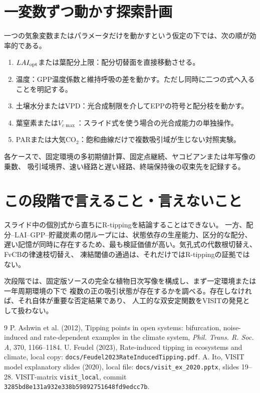 \documentclass[a4paper,11pt]{ltjsarticle}
\newcommand{\code}[1]{\nolinkurl{#1}}
\begin{document}
\section{一変数ずつ動かす探索計画}
一つの気象変数またはパラメータだけを動かすという仮定の下では、次の順が効率的である。
\begin{enumerate}
\item $LAI_{\rm opt}$または葉配分上限：配分切替面を直接移動させる。
\item 温度：GPP温度係数と維持呼吸の差を動かす。ただし同時に二つの式へ入ることを明記する。
\item 土壌水分またはVPD：光合成制限を介してEPPの符号と配分枝を動かす。
\item 葉窒素または$V_{c\max}$：スライド式を使う場合の光合成能力の単独操作。
\item PARまたは大気$\mathrm{CO_2}$：飽和曲線だけで複数吸引域が生じない対照実験。
\end{enumerate}
各ケースで、固定環境の多初期値計算、固定点継続、ヤコビアンまたは年写像の乗数、
吸引域境界、速い経路と遅い経路、終端保持後の収束先を記録する。

\section{この段階で言えること・言えないこと}
スライド中の個別式から直ちにR-tippingを結論することはできない。
一方、配分--LAI--GPP--貯蔵炭素の閉ループには、状態依存の生産能力、区分的な配分、
遅い記憶が同時に存在するため、最も検証価値が高い。気孔式の代数根切替え、FvCBの律速枝切替え、
凍結閾値の通過は、それだけではR-tippingの証拠ではない。

次段階では、固定版ソースの完全な植物日次写像を構成し、まず一定環境または一年周期環境の下で
複数の正の吸引状態が存在するかを調べる。存在しなければ、それ自体が重要な否定結果であり、
人工的な双安定関数をVISITの発見として扱わない。

\begin{thebibliography}{9}
 P. Ashwin et al. (2012), Tipping points in open systems:
bifurcation, noise-induced and rate-dependent examples in the climate system,
\emph{Phil. Trans. R. Soc. A}, 370, 1166--1184.
 U. Feudel (2023), Rate-induced tipping in ecosystems and climate,
local copy: \code{docs/Feudel2023RateInducedTipping.pdf}.
 A. Ito, VISIT model explanatory slides (2020),
local file: \code{docs/visit_ex_2020.pptx}, slides 19--28.
 VISIT-matrix \code{visit_local}, commit
\code{3285bd8e131a932e338b59892751648fd9edcc7b}.
\end{thebibliography}
\end{document}
